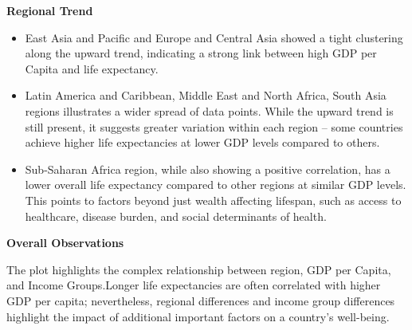 \documentclass{article}\usepackage[]{graphicx}\usepackage[]{xcolor}
\begin{document}
\textbf{Regional Trend}
\begin{itemize}
\item{East Asia  and Pacific and Europe and Central Asia showed a tight clustering along the upward trend, indicating a strong link between high GDP per Capita and life expectancy.}

\item{Latin America and Caribbean, Middle East and North Africa, South Asia  regions illustrates a wider spread of data points. While the upward trend is still present, it suggests greater variation within each region – some countries achieve higher life expectancies at lower GDP levels compared to others.}

\item{Sub-Saharan Africa region, while also showing a positive correlation, has a lower overall life expectancy compared to other regions at similar GDP levels. This points to factors beyond just wealth affecting lifespan, such as access to healthcare, disease burden, and social determinants of health.}
\end{itemize}


\textbf{Overall Observations}

The plot highlights the complex relationship between region, GDP per Capita, and Income Groups.Longer life expectancies are often correlated with higher GDP per capita; nevertheless, regional differences and income group differences highlight the impact of additional important factors on a country's well-being.
\end{document}
